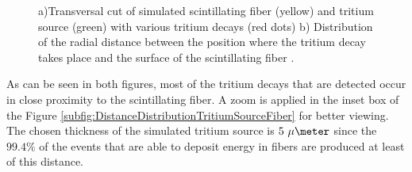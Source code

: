 \begin{figure}[h]
 \centering
 \caption{a)Transversal cut of simulated scintillating fiber (yellow) and tritium source (green) with various tritium decays (red dots) b) Distribution of the radial distance between the position where the tritium decay takes place and the surface of the scintillating fiber \cite{SimulationPaperCarlos}.}
 \label{fig:TritiumSourceSimulated}
\end{figure}	

As can be seen in both figures, most of the tritium decays that are detected occur in close proximity to the scintillating fiber.  A zoom is applied in the inset box of the Figure \ref{subfig:DistanceDistributionTritiumSourceFiber} for better viewing. The chosen thickness of the simulated tritium source is $5~\mu\meter$ since the $99.4\%$ of the events that are able to deposit energy in fibers are produced at least of this distance.